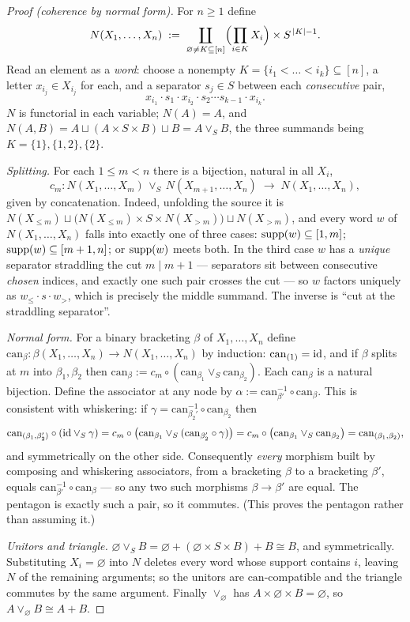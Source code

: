 \begin{proof}[Proof (coherence by normal form)]
For $n\ge 1$ define
\[
  N(X_1,\dots,X_n)\;:=\;\coprod_{\varnothing\neq K\subseteq[n]}
   \Bigl(\prod_{i\in K} X_i\Bigr)\times S^{\,|K|-1}.
\]
Read an element as a \emph{word}: choose a nonempty
$K=\{i_1<\dots<i_k\}\subseteq[n]$, a letter $x_{i_j}\in X_{i_j}$ for each, and a
separator $s_j\in S$ between each \emph{consecutive} pair,
\[
   x_{i_1}\cdot s_1\cdot x_{i_2}\cdot s_2\cdots s_{k-1}\cdot x_{i_k}.
\]
$N$ is functorial in each variable; $N(A)=A$, and
$N(A,B)=A\sqcup(A\times S\times B)\sqcup B=A\vee_S B$, the three summands being
$K=\{1\},\{1,2\},\{2\}$.

\emph{Splitting.} For each $1\le m<n$ there is a bijection, natural in all
$X_i$,
\[
  c_m\colon N(X_1,\dots,X_m)\,\vee_S\,N(X_{m+1},\dots,X_n)\;\longrightarrow\;
   N(X_1,\dots,X_n),
\]
given by concatenation. Indeed, unfolding the source it is
$N(X_{\le m})\sqcup\bigl(N(X_{\le m})\times S\times N(X_{>m})\bigr)\sqcup
N(X_{>m})$, and every word $w$ of $N(X_1,\dots,X_n)$ falls into exactly one of
three cases: $\operatorname{supp}(w)\subseteq[1,m]$; $\operatorname{supp}(w)\subseteq[m+1,n]$; or $\operatorname{supp}(w)$
meets both. In the third case $w$ has a \emph{unique} separator straddling the
cut $m\mid m+1$ --- separators sit between consecutive \emph{chosen} indices, and
exactly one such pair crosses the cut --- so $w$ factors uniquely as
$w_{\le}\cdot s\cdot w_{>}$, which is precisely the middle summand. The inverse
is ``cut at the straddling separator''.

\emph{Normal form.} For a binary bracketing $\beta$ of $X_1,\dots,X_n$ define
$\mathrm{can}_\beta\colon\beta(X_1,\dots,X_n)\to N(X_1,\dots,X_n)$ by induction:
$\mathrm{can}_{(1)}=\mathrm{id}$, and if $\beta$ splits at $m$ into $\beta_1,\beta_2$
then $\mathrm{can}_\beta:=c_m\circ(\mathrm{can}_{\beta_1}\vee_S
\mathrm{can}_{\beta_2})$. Each $\mathrm{can}_\beta$ is a natural bijection.
Define the associator at any node by
$\alpha:=\mathrm{can}_{\beta'}^{-1}\circ\mathrm{can}_\beta$. This is consistent
with whiskering: if $\gamma=\mathrm{can}_{\beta_2'}^{-1}\circ\mathrm{can}_{\beta_2}$
then
\[
 \mathrm{can}_{(\beta_1,\beta_2')}\circ(\mathrm{id}\vee_S\gamma)
  = c_m\circ\bigl(\mathrm{can}_{\beta_1}\vee_S(\mathrm{can}_{\beta_2'}\circ\gamma)\bigr)
  = c_m\circ\bigl(\mathrm{can}_{\beta_1}\vee_S\mathrm{can}_{\beta_2}\bigr)
  = \mathrm{can}_{(\beta_1,\beta_2)},
\]
and symmetrically on the other side. Consequently \emph{every} morphism built by
composing and whiskering associators, from a bracketing $\beta$ to a bracketing
$\beta'$, equals $\mathrm{can}_{\beta'}^{-1}\circ\mathrm{can}_\beta$ --- so any
two such morphisms $\beta\to\beta'$ are equal. The pentagon is exactly such a
pair, so it commutes. (This proves the pentagon rather than assuming it.)

\emph{Unitors and triangle.} $\varnothing\vee_S B=\varnothing+(\varnothing\times
S\times B)+B\cong B$, and symmetrically. Substituting $X_i=\varnothing$ into $N$
deletes every word whose support contains $i$, leaving $N$ of the remaining
arguments; so the unitors are $\mathrm{can}$-compatible and the triangle
commutes by the same argument. Finally $\vee_{\varnothing}$ has
$A\times\varnothing\times B=\varnothing$, so $A\vee_{\varnothing}B\cong A+B$.
\end{proof}

